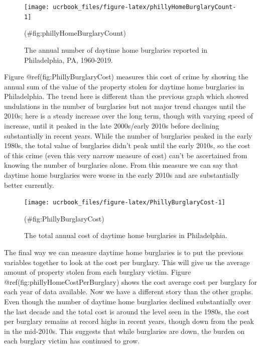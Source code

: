 \documentclass[
  12pt,
  openany]{book}
\begin{document}
\begin{figure}

{\centering \texttt{[image: ucrbook\_files/figure-latex/phillyHomeBurglaryCount-1]} 

}

\caption{The annual number of daytime home burglaries reported in Philadelphia, PA, 1960-2019.}(\#fig:phillyHomeBurglaryCount)
\end{figure}

Figure @ref(fig:PhillyBurglaryCost) measures this cost of crime by showing the annual sum of the value of the property stolen for daytime home burglaries in Philadelphia. The trend here is different than the previous graph which showed undulations in the number of burglaries but not major trend changes until the 2010s; here is a steady increase over the long term, though with varying speed of increase, until it peaked in the late 2000s/early 2010s before declining substantially in recent years. While the number of burglaries peaked in the early 1980s, the total value of burglaries didn't peak until the early 2010s, so the cost of this crime (even this very narrow measure of cost) can't be ascertained from knowing the number of burglaries alone. From this measure we can say that daytime home burglaries were worse in the early 2010s and are substantially better currently.

\begin{figure}

{\centering \texttt{[image: ucrbook\_files/figure-latex/PhillyBurglaryCost-1]} 

}

\caption{The total annual cost of daytime home burglaries in Philadelphia.}(\#fig:PhillyBurglaryCost)
\end{figure}

The final way we can measure daytime home burglaries is to put the previous variables together to look at the cost per burglary. This will give us the average amount of property stolen from each burglary victim. Figure @ref(fig:phillyHomeCostPerBurglary) shows the cost average cost per burglary for each year of data available. Now we have a different story than the other graphs. Even though the number of daytime home burglaries declined substantially over the last decade and the total cost is around the level seen in the 1980s, the cost per burglary remains at record highs in recent years, though down from the peak in the mid-2010s. This suggests that while burglaries are down, the burden on each burglary victim has continued to grow.
\end{document}
